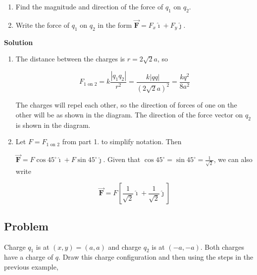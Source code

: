 \documentclass{article}
\renewcommand{\mbox}{\text}
\newcommand{\ihat}[0]{\hat{\boldsymbol{\imath}}}
\newcommand{\jhat}[0]{\hat{\boldsymbol{\jmath}}}
\newcommand{\bfvec}[1]{\vec{\mathbf{#1}}}
\begin{document}
\begin{enumerate}

  \item Find the magnitude and direction of the force of $q_1$ on $q_2$.

  \item Write the force of $q_1$ on $q_2$ in the form $\bfvec{F}=F_x\ihat + F_y\jhat$.

\end{enumerate}

\ifsolutions
\textbf{Solution}

    \begin{enumerate}

      \item The distance between the charges is $r=2\sqrt{2}a$, so

        \begin{equation}
        F_{1\mbox{ on } 2}=k\frac{|q_1q_2|}{r^2}=\frac{k|qq|}{(2\sqrt{2}a)^2}=\frac{kq^2}{8a^2}
        \end{equation}

            The charges will repel each other, so the direction of forces of one on the other will be as shown in the diagram. The direction of the force vector on $q_2$ is shown in the diagram.

            

      \item Let $F = F_{1\mbox{ on } 2}$ from part 1. to simplify notation. Then

            $\bfvec{F} = F\cos 45^\circ \ihat + F\sin 45^\circ \jhat$. Given that $\cos 45^\circ=\sin 45^\circ = \frac{1}{\sqrt{2}}$, we can also write

        \begin{equation}
        \bfvec{F} = F\left[\frac{1}{\sqrt{2}}\ihat + \frac{1}{\sqrt{2}}\jhat\right]
        \end{equation}

    \end{enumerate}
\fi

\subsection{Problem}

Charge $q_1$ is at $(x,y)=(a,a)$ and charge $q_2$ is at $(-a, -a)$. Both charges have a charge of $q$. Draw this charge configuration and then using the steps in the previous example,


\end{document}
